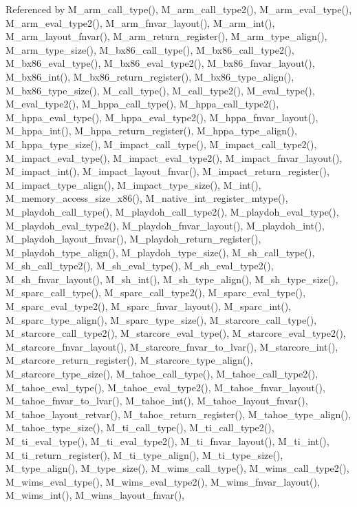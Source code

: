 Referenced by M\_\-arm\_\-call\_\-type(), M\_\-arm\_\-call\_\-type2(), M\_\-arm\_\-eval\_\-type(), M\_\-arm\_\-eval\_\-type2(), M\_\-arm\_\-fnvar\_\-layout(), M\_\-arm\_\-int(), M\_\-arm\_\-layout\_\-fnvar(), M\_\-arm\_\-return\_\-register(), M\_\-arm\_\-type\_\-align(), M\_\-arm\_\-type\_\-size(), M\_\-bx86\_\-call\_\-type(), M\_\-bx86\_\-call\_\-type2(), M\_\-bx86\_\-eval\_\-type(), M\_\-bx86\_\-eval\_\-type2(), M\_\-bx86\_\-fnvar\_\-layout(), M\_\-bx86\_\-int(), M\_\-bx86\_\-return\_\-register(), M\_\-bx86\_\-type\_\-align(), M\_\-bx86\_\-type\_\-size(), M\_\-call\_\-type(), M\_\-call\_\-type2(), M\_\-eval\_\-type(), M\_\-eval\_\-type2(), M\_\-hppa\_\-call\_\-type(), M\_\-hppa\_\-call\_\-type2(), M\_\-hppa\_\-eval\_\-type(), M\_\-hppa\_\-eval\_\-type2(), M\_\-hppa\_\-fnvar\_\-layout(), M\_\-hppa\_\-int(), M\_\-hppa\_\-return\_\-register(), M\_\-hppa\_\-type\_\-align(), M\_\-hppa\_\-type\_\-size(), M\_\-impact\_\-call\_\-type(), M\_\-impact\_\-call\_\-type2(), M\_\-impact\_\-eval\_\-type(), M\_\-impact\_\-eval\_\-type2(), M\_\-impact\_\-fnvar\_\-layout(), M\_\-impact\_\-int(), M\_\-impact\_\-layout\_\-fnvar(), M\_\-impact\_\-return\_\-register(), M\_\-impact\_\-type\_\-align(), M\_\-impact\_\-type\_\-size(), M\_\-int(), M\_\-memory\_\-access\_\-size\_\-x86(), M\_\-native\_\-int\_\-register\_\-mtype(), M\_\-playdoh\_\-call\_\-type(), M\_\-playdoh\_\-call\_\-type2(), M\_\-playdoh\_\-eval\_\-type(), M\_\-playdoh\_\-eval\_\-type2(), M\_\-playdoh\_\-fnvar\_\-layout(), M\_\-playdoh\_\-int(), M\_\-playdoh\_\-layout\_\-fnvar(), M\_\-playdoh\_\-return\_\-register(), M\_\-playdoh\_\-type\_\-align(), M\_\-playdoh\_\-type\_\-size(), M\_\-sh\_\-call\_\-type(), M\_\-sh\_\-call\_\-type2(), M\_\-sh\_\-eval\_\-type(), M\_\-sh\_\-eval\_\-type2(), M\_\-sh\_\-fnvar\_\-layout(), M\_\-sh\_\-int(), M\_\-sh\_\-type\_\-align(), M\_\-sh\_\-type\_\-size(), M\_\-sparc\_\-call\_\-type(), M\_\-sparc\_\-call\_\-type2(), M\_\-sparc\_\-eval\_\-type(), M\_\-sparc\_\-eval\_\-type2(), M\_\-sparc\_\-fnvar\_\-layout(), M\_\-sparc\_\-int(), M\_\-sparc\_\-type\_\-align(), M\_\-sparc\_\-type\_\-size(), M\_\-starcore\_\-call\_\-type(), M\_\-starcore\_\-call\_\-type2(), M\_\-starcore\_\-eval\_\-type(), M\_\-starcore\_\-eval\_\-type2(), M\_\-starcore\_\-fnvar\_\-layout(), M\_\-starcore\_\-fnvar\_\-to\_\-lvar(), M\_\-starcore\_\-int(), M\_\-starcore\_\-return\_\-register(), M\_\-starcore\_\-type\_\-align(), M\_\-starcore\_\-type\_\-size(), M\_\-tahoe\_\-call\_\-type(), M\_\-tahoe\_\-call\_\-type2(), M\_\-tahoe\_\-eval\_\-type(), M\_\-tahoe\_\-eval\_\-type2(), M\_\-tahoe\_\-fnvar\_\-layout(), M\_\-tahoe\_\-fnvar\_\-to\_\-lvar(), M\_\-tahoe\_\-int(), M\_\-tahoe\_\-layout\_\-fnvar(), M\_\-tahoe\_\-layout\_\-retvar(), M\_\-tahoe\_\-return\_\-register(), M\_\-tahoe\_\-type\_\-align(), M\_\-tahoe\_\-type\_\-size(), M\_\-ti\_\-call\_\-type(), M\_\-ti\_\-call\_\-type2(), M\_\-ti\_\-eval\_\-type(), M\_\-ti\_\-eval\_\-type2(), M\_\-ti\_\-fnvar\_\-layout(), M\_\-ti\_\-int(), M\_\-ti\_\-return\_\-register(), M\_\-ti\_\-type\_\-align(), M\_\-ti\_\-type\_\-size(), M\_\-type\_\-align(), M\_\-type\_\-size(), M\_\-wims\_\-call\_\-type(), M\_\-wims\_\-call\_\-type2(), M\_\-wims\_\-eval\_\-type(), M\_\-wims\_\-eval\_\-type2(), M\_\-wims\_\-fnvar\_\-layout(), M\_\-wims\_\-int(), M\_\-wims\_\-layout\_\-fnvar(), 